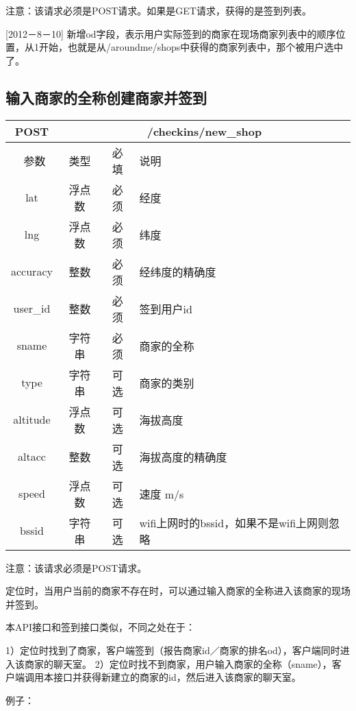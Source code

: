 \documentclass[cs4size]{ctexartutf8}
\begin{document}
注意：该请求必须是POST请求。如果是GET请求，获得的是签到列表。

[2012－8－10] 新增od字段，表示用户实际签到的商家在现场商家列表中的顺序位置，从1开始，也就是从/aroundme/shops中获得的商家列表中，那个被用户选中了。



\subsection{输入商家的全称创建商家并签到}

\begin{table}[H]
   \begin{center}
\begin{tabular}{|c|c|c|p{12cm}|}
\hline
POST & \multicolumn{3}{|c|}{/checkins/new\_shop} \\
\hline\hline
 \  参数  & 类型 & 必填 &  说明  \\
\hline
 lat  & 浮点数 & 必须 & 经度\\
\hline
 lng  &  浮点数 & 必须 & 纬度\\ 
\hline
 accuracy  & 整数 & 必须 & 经纬度的精确度\\ 
\hline
 user\_id  & 整数 & 必须 &  签到用户id\\ 
\hline
 sname  & 字符串 & 必须 &  商家的全称\\  
\hline
 type  & 字符串 & 可选 &  商家的类别\\   
\hline
 altitude  &  浮点数 & 可选 & 海拔高度\\ 
\hline
 altacc  & 整数 & 可选 & 海拔高度的精确度\\  
 \hline
 speed  & 浮点数 & 可选 & 速度 m/s\\   
\hline
 bssid  & 字符串 & 可选 & wifi上网时的bssid，如果不是wifi上网则忽略\\  
\hline
\end{tabular}
   \end{center}
\end{table}

注意：该请求必须是POST请求。

定位时，当用户当前的商家不存在时，可以通过输入商家的全称进入该商家的现场并签到。

本API接口和签到接口类似，不同之处在于：

1）定位时找到了商家，客户端签到（报告商家id／商家的排名od），客户端同时进入该商家的聊天室。
2）定位时找不到商家，用户输入商家的全称（sname），客户端调用本接口并获得新建立的商家的id，然后进入该商家的聊天室。


例子：
\end{document}
